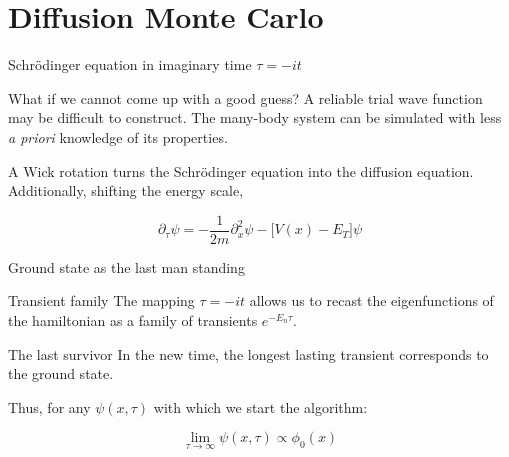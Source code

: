 \documentclass{beamer}
\begin{document}
  \section{Diffusion Monte Carlo}
  \begin{frame}{Schr\"odinger equation in imaginary time $\tau = -it$}
  \begin{block}{What if we cannot come up with a good guess?}
  	A reliable trial wave function may be difficult to construct. The many-body system can be simulated with less \emph{a priori} knowledge of its properties.
  	\end{block}
  	
  	 A Wick rotation turns the Schr\"odinger equation into the diffusion equation. Additionally, shifting the energy scale,
  	
  	\begin{equation*}
  	\partial_\tau \psi = -\frac{1}{2m} \partial_x^2 \psi -  \bigg[ V(x) - E_T \bigg] \psi
  	\end{equation*}
  \end{frame}
  
  \begin{frame}{Ground state as the last man standing}
  
  \begin{block}{Transient family}
  	The mapping $\tau = -it$ allows us to recast the eigenfunctions of the hamiltonian as a family of transients $e^{-E_n \tau}$.
  	\end{block}
  	\begin{block}{The last survivor}
  	 In the new time, the longest lasting transient corresponds to the ground state. 
  	 \end{block}
  	 
  	 Thus, for any $\psi (x, \tau)$ with which we start the algorithm:
  	
  	\begin{equation*}
  	\lim_{\tau \rightarrow \infty} \psi (x, \tau) \propto \phi_0 (x)
  	\end{equation*}
  \end{frame}
  
\end{document}
